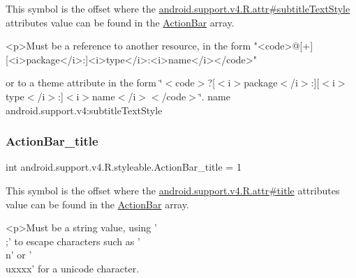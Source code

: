 This symbol is the offset where the \hyperlink{classandroid_1_1support_1_1v4_1_1R_1_1attr_a13ed407cca47c2a56528aa612128ea4c}{android.\+support.\+v4.\+R.\+attr\#subtitle\+Text\+Style} attribute\textquotesingle{}s value can be found in the \hyperlink{classandroid_1_1support_1_1v4_1_1R_1_1styleable_adc5a3492b9c46265760d7120a04d6afa}{Action\+Bar} array.

\begin{DoxyVerb}      <p>Must be a reference to another resource, in the form "<code>@[+][<i>package</i>:]<i>type</i>:<i>name</i></code>"
\end{DoxyVerb}
 or to a theme attribute in the form \char`\"{}$<$code$>$?\mbox{[}$<$i$>$package$<$/i$>$\+:\mbox{]}\mbox{[}$<$i$>$type$<$/i$>$\+:\mbox{]}$<$i$>$name$<$/i$>$$<$/code$>$\char`\"{}.  name android.\+support.\+v4\+:subtitle\+Text\+Style \mbox{\label{classandroid_1_1support_1_1v4_1_1R_1_1styleable_a342a7d8b0f7041ad4c7860c268da0784}} 
\subsubsection{\texorpdfstring{Action\+Bar\+\_\+title}{ActionBar\_title}}
{\footnotesize\ttfamily int android.\+support.\+v4.\+R.\+styleable.\+Action\+Bar\+\_\+title = 1\hspace{0.3cm}{\ttfamily [static]}}

This symbol is the offset where the \hyperlink{classandroid_1_1support_1_1v4_1_1R_1_1attr_aaa11a7e1e11d0e32f6bae3e8951a2fb8}{android.\+support.\+v4.\+R.\+attr\#title} attribute\textquotesingle{}s value can be found in the \hyperlink{classandroid_1_1support_1_1v4_1_1R_1_1styleable_adc5a3492b9c46265760d7120a04d6afa}{Action\+Bar} array.

\begin{DoxyVerb}      <p>Must be a string value, using '\\;' to escape characters such as '\\n' or '\\uxxxx' for a unicode character.
\end{DoxyVerb}
 

